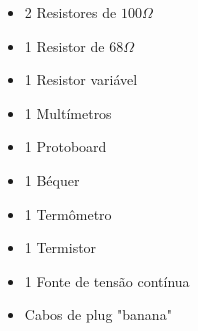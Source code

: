 \begin{itemize}
    \item 2 Resistores de $100\Omega$
    \item 1 Resistor de $68\Omega$
    \item 1 Resistor variável
    \item 1 Multímetros
    \item 1 Protoboard
    \item 1 Béquer
    \item 1 Termômetro
    \item 1 Termistor
    \item 1 Fonte de tensão contínua
    \item Cabos de plug "banana"
\end{itemize}